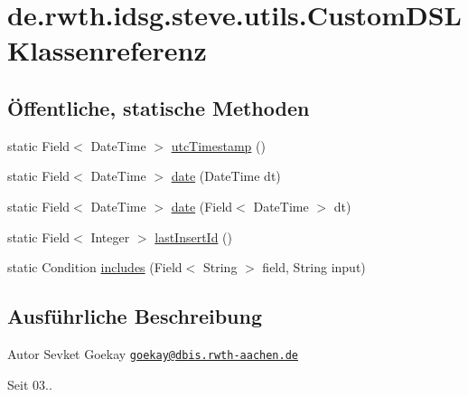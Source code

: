 \hypertarget{classde_1_1rwth_1_1idsg_1_1steve_1_1utils_1_1_custom_d_s_l}{\section{de.\+rwth.\+idsg.\+steve.\+utils.\+Custom\+D\+S\+L Klassenreferenz}
\label{classde_1_1rwth_1_1idsg_1_1steve_1_1utils_1_1_custom_d_s_l}
}
\subsection*{Öffentliche, statische Methoden}
\begin{DoxyCompactItemize}
\item 
static Field$<$ Date\+Time $>$ \hyperlink{classde_1_1rwth_1_1idsg_1_1steve_1_1utils_1_1_custom_d_s_l_a588f1723f1c9760604fb917d73e101b1}{utc\+Timestamp} ()
\item 
static Field$<$ Date\+Time $>$ \hyperlink{classde_1_1rwth_1_1idsg_1_1steve_1_1utils_1_1_custom_d_s_l_aa6bb05dc49ce963f813912301159f99c}{date} (Date\+Time dt)
\item 
static Field$<$ Date\+Time $>$ \hyperlink{classde_1_1rwth_1_1idsg_1_1steve_1_1utils_1_1_custom_d_s_l_a7bedc890a58fe9611f95388e52f9c10e}{date} (Field$<$ Date\+Time $>$ dt)
\item 
static Field$<$ Integer $>$ \hyperlink{classde_1_1rwth_1_1idsg_1_1steve_1_1utils_1_1_custom_d_s_l_ae6bda68f41bf6c60fe1c5aad640ac1bf}{last\+Insert\+Id} ()
\item 
static Condition \hyperlink{classde_1_1rwth_1_1idsg_1_1steve_1_1utils_1_1_custom_d_s_l_a6b48ccc35d19e79083fbedcc672bf5c5}{includes} (Field$<$ String $>$ field, String input)
\end{DoxyCompactItemize}


\subsection{Ausführliche Beschreibung}
\begin{DoxyAuthor}{Autor}
Sevket Goekay \href{mailto:goekay@dbis.rwth-aachen.de}{\tt goekay@dbis.\+rwth-\/aachen.\+de} 
\end{DoxyAuthor}
\begin{DoxySince}{Seit}
03.. 
\end{DoxySince}


